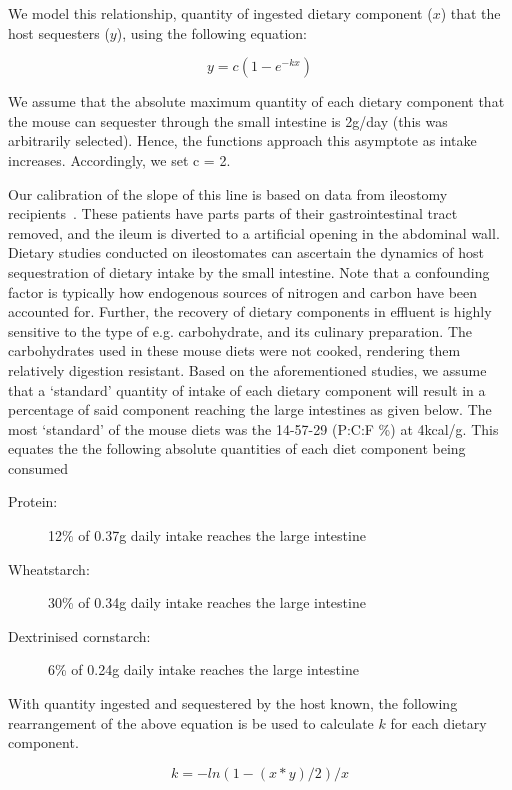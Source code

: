 \documentclass{article}
\begin{document}
We model this relationship, quantity of ingested dietary component ($x$) that the host sequesters ($y$), using the following equation:

\begin{equation}
  y = c (1 - e^{-kx})  
\end{equation}

We assume that the absolute maximum quantity of each dietary component that the mouse can sequester through the small intestine is 2g/day (this was arbitrarily selected). 
Hence, the functions approach this asymptote as intake increases.
Accordingly, we set c = 2.  

Our calibration of the slope of this line is based on data from ileostomy recipients~\cite{Silvester1995,Isaksson1983,Silvester1995a,Englyst1986,Englyst1985}. 
These patients have parts parts of their gastrointestinal tract removed, and the ileum is diverted to a artificial opening in the abdominal wall. 
Dietary studies conducted on ileostomates can ascertain the dynamics of host sequestration of dietary intake by the small intestine. 
Note that a confounding factor is typically how endogenous sources of nitrogen and carbon have been accounted for.
Further, the recovery of dietary components in effluent is highly sensitive to the type of e.g. carbohydrate, and its culinary preparation. 
The carbohydrates used in these mouse diets were not cooked, rendering them relatively digestion resistant. 
Based on the aforementioned studies, we assume that a `standard' quantity of intake of each dietary component will result in a percentage of said component reaching the large intestines as given below.
The most `standard' of the mouse diets was the 14-57-29 (P:C:F \%) at 4kcal/g. This equates the the following absolute quantities of each diet component being consumed
\begin{description}
  \item[Protein:] 12\% of 0.37g daily intake reaches the large intestine
  \item[Wheatstarch:] 30\% of 0.34g daily intake reaches the large intestine
  \item[Dextrinised cornstarch:] 6\% of 0.24g daily intake reaches the large intestine
\end{description} 

With quantity ingested and sequestered by the host known, the following rearrangement of the above equation is be used to calculate $k$ for each dietary component. 

\begin{equation}
  k = -ln(1 - (x * y) / 2) / x
\end{equation}
\end{document}
